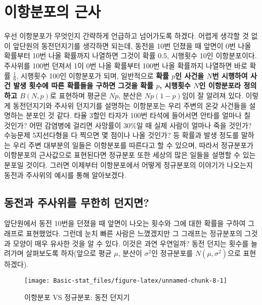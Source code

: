 \documentclass[]{book}
\begin{document}
\hypertarget{uxc774uxd56duxbd84uxd3ecuxc758-uxadfcuxc0ac}{%
\section{이항분포의 근사}\label{uxc774uxd56duxbd84uxd3ecuxc758-uxadfcuxc0ac}}

우선 이항분포가 무엇인지 간략하게 언급하고 넘어가도록 하겠다. 어렵게 생각할 것 없이 앞단원의 동전던지기를 생각하면 되는데, 동전을 10번 던졌을 때 앞면이 0번 나올 확률부터 10번 나올 확률까지 나열하면 그것이 확률 0.5, 시행횟수 10인 이항분포이다. 주사위를 100번 던져서 1이 0번 나올 확률부터 100번 나올 확률까지 나열하면 바로 확률 \(\frac{1}{6}\), 시행횟수 100인 이항분포가 되며, 일반적으로 \textbf{확률 \(p\)인 사건을 \(N\)번 시행하여 사건 발생 횟수에 따른 확률들을 구하면 그것을 확률 \(p\), 시행횟수 \(N\)인 이항분포라 정의하고 \(B(N,p)\)}로 표현하며 평균은 \(Np\), 분산은 \(Np(1-p)\)임이 잘 알려져 있다. 이렇게 동전던지기와 주사위 던지기를 설명하는 이항분포는 우리 주변의 온갖 사건들을 설명하는 분포인 것 같다. 타율 3할인 타자가 100번 타석에 들어서면 안타를 얼마나 칠 것인가? 어떤 감염병에 걸리면 사망률이 30\%일 때 실제 사람이 얼마나 죽을 것인가? 수능문제 5지선다형을 다 찍으면 몇 점이나 나올 것인가? 등 확률과 발생 정도를 말하는 우리 주변 대부분의 일들은 이항분포를 따른다고 할 수 있으며, 따라서 정규분포가 이항분포의 근사값으로 표현된다면 정규분포 또한 세상의 많은 일들을 설명할 수 있는 분포일 것이다. 그러면 이제부터 이항분포에서 어떻게 정규분포의 이야기가 나오는지 동전과 주사위의 예시를 통해 알아보겠다.

\hypertarget{uxb3d9uxc804uxacfc-uxc8fcuxc0acuxc704uxb97c-uxbb34uxd55cuxd788-uxb358uxc9c0uxba74}{%
\subsection{동전과 주사위를 무한히 던지면?}\label{uxb3d9uxc804uxacfc-uxc8fcuxc0acuxc704uxb97c-uxbb34uxd55cuxd788-uxb358uxc9c0uxba74}}

앞단원에서 동전 10번을 던졌을 때 앞면이 나오는 횟수와 그에 대한 확률을 구하여 그래프로 표현했었다. 그런데 눈치 빠른 사람은 느꼈겠지만 그 그래프는 정규분포의 그것과 모양이 매우 유사한 것을 알 수 있다. 이것은 과연 우연일까?
동전 던지는 횟수를 늘려가며 살펴보도록 하자(앞으로 평균 \(\mu\), 분산이 \(\sigma^2\)인 정규분포를 \(N(\mu,\sigma^2)\)으로 표현하겠다).

\begin{figure}

{\centering \texttt{[image: Basic-stat\_files/figure-latex/unnamed-chunk-8-1]} 

}

\caption{ 이항분포 VS 정규분포: 동전 던지기}\label{fig:unnamed-chunk-8}
\end{figure}
\end{document}
